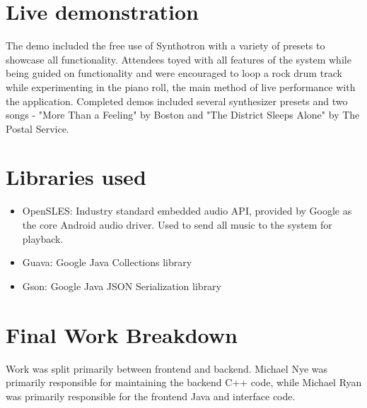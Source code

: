 \documentclass[letterpaper,12pt]{article}
\begin{document}
\section{Live demonstration}

The demo included the free use of Synthotron with a variety of presets to showcase all functionality. Attendees toyed with all features of the system while being guided on functionality and were encouraged to loop a rock drum track while experimenting in the piano roll, the main method of live performance with the application. Completed demos included several synthesizer presets and two songs - "More Than a Feeling" by Boston and "The District Sleeps Alone" by The Postal Service.



\section{Libraries used}
\begin{itemize}
    \item OpenSLES: Industry standard embedded audio API, provided by Google as the core Android audio driver. Used to send all music to the system for playback. \cite{opensles}
    \item Guava: Google Java Collections library \cite{guava}
    \item Gson: Google Java JSON Serialization library \cite{gson}
\end{itemize}



\clearpage
\section{Final Work Breakdown}

Work was split primarily between frontend and backend. Michael Nye was primarily responsible for maintaining the backend C++ code, while Michael Ryan was primarily responsible for the frontend Java and interface code. \\
\end{document}
